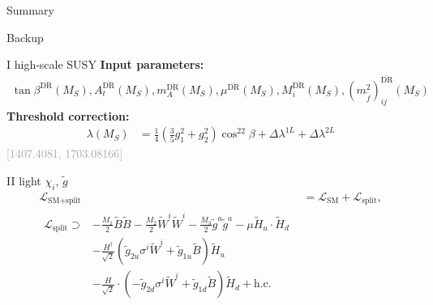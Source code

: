 \documentclass[hyperref={pdfpagelabels=false},ngerman]{beamer}
\newcommand{\MS}{\ensuremath{M_S}}
\newcommand{\bigcite}[1]{\textcolor{darkgray}{[#1]}}
\renewcommand{\emph}{\textbf}
\newcommand{\DRbar}{\ensuremath{\overline{\text{DR}}}}
\newcommand{\SM}{\ensuremath{\text{SM}}}
\newcommand{\SplitMSSM}{\ensuremath{\text{SM+split}}\xspace}
\newcommand{\hc}{\ensuremath{\text{h.c.}}}
\newcommand{\Lag}{\ensuremath{\mathcal{L}}}
\newcommand{\DlHSSUSY}[1]{\ensuremath{\Delta\lambda^{#1L}}}
\newcommand{\gSplitMSSM}[1]{\ensuremath{\tilde{g}_{#1}}}
\begin{document}
\begin{frame}{Summary}
\end{frame}


\begin{frame}[noframenumbering]
  \begin{center}
    \Huge Backup
  \end{center}
\end{frame}

\begin{frame}[noframenumbering]{I high-scale SUSY}
  \emph{Input parameters:}
  \begin{align*}
  \tan\beta^{\DRbar}(\MS), A_t^{\DRbar}(\MS), m_A^{\DRbar}(\MS),
  \mu^{\DRbar}(\MS), M_i^{\DRbar}(\MS),
  (m_{\tilde{f}}^2)^{\DRbar}_{ij}(\MS)
  \end{align*}
  \emph{Threshold correction:}
  \begin{align*}
    \lambda(\MS) &= \frac{1}{4}\left(\frac{3}{5} g_1^2 +
                   g_2^2\right) \cos^22\beta + \DlHSSUSY{1} + \DlHSSUSY{2}
  \end{align*}
  \hfill\bigcite{1407.4081, 1703.08166}
\end{frame}

\begin{frame}[noframenumbering]{II light $\chi_i$, $\tilde{g}$}
\begin{align*}
  \Lag_{\SplitMSSM} &= \Lag_{\SM} + \Lag_\text{split}, \\
\begin{split}
  \Lag_\text{split} \supset
  &- \frac{M_1}{2} \tilde{B}\tilde{B}
  - \frac{M_2}{2} \tilde{W}^i\tilde{W}^i
  - \frac{M_3}{2} \tilde{g}^a\tilde{g}^a
  - \mu \tilde{H}_u\cdot \tilde{H}_d \\
  &-\frac{H^\dagger}{\sqrt{2}} \left(
    \gSplitMSSM{2u} \sigma^i\tilde{W}^i + \gSplitMSSM{1u} \tilde{B}
  \right)\tilde{H}_u \\
  &-\frac{H}{\sqrt{2}} \cdot  \left(
    -\gSplitMSSM{2d} \sigma^i\tilde{W}^i + \gSplitMSSM{1d} \tilde{B}
  \right) \tilde{H}_d
  + \hc
\end{split}
\end{align*}
\end{frame}
\end{document}
